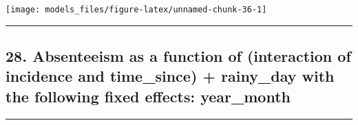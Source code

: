 \documentclass[]{article}
\begin{document}
\begin{center}\texttt{[image: models\_files/figure-latex/unnamed-chunk-36-1]} \end{center}

\newpage

\begin{center}\rule{0.5\linewidth}{\linethickness}\end{center}

\subsection{28. Absenteeism as a function of (interaction of incidence
and time\_since) + rainy\_day with the following fixed effects:
year\_month}\label{absenteeism-as-a-function-of-interaction-of-incidence-and-time_since-rainy_day-with-the-following-fixed-effects-year_month}

\begin{center}\rule{0.5\linewidth}{\linethickness}\end{center}
\end{document}
